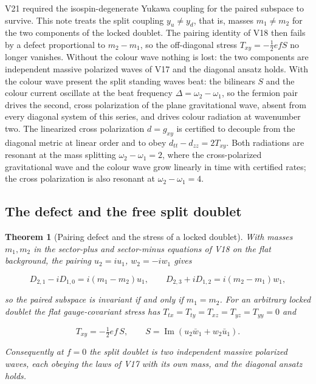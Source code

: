 \documentclass[11pt]{article}
\newtheorem{theorem}{Theorem}[section]
\theoremstyle{remark}
\begin{document}
V21 required the isospin-degenerate Yukawa coupling for the paired
subspace to survive.  This note treats the split coupling
\(y_u\neq y_d\), that is, masses \(m_1\neq m_2\) for the two
components of the locked doublet.  The pairing identity of V18 then
fails by a defect proportional to \(m_2-m_1\), so the off-diagonal
stress \(T_{xy}=-\tfrac12efS\) no longer vanishes.  Without the colour
wave nothing is lost: the two components are independent massive
polarized waves of V17 and the diagonal ansatz holds.  With the colour
wave present the split standing waves beat: the bilinears
\(S\) and the colour current oscillate at the beat frequency
\(\Delta=\omega_2-\omega_1\), so the fermion pair drives the second,
cross polarization of the plane gravitational wave, absent from every
diagonal system of this series, and drives colour radiation at
wavenumber two.  The linearized cross polarization \(d=g_{xy}\) is
certified to decouple from the diagonal metric at linear order and to
obey \(d_{tt}-d_{zz}=2T_{xy}\).  Both radiations are resonant at the
mass splitting \(\omega_2-\omega_1=2\), where the cross-polarized
gravitational wave and the colour wave grow linearly in time with
certified rates; the cross polarization is also resonant at
\(\omega_2-\omega_1=4\).

\subsection{The defect and the free split doublet}

\begin{theorem}[Pairing defect and the stress of a locked doublet]
\label{thm:v20v22-defect}
With masses \(m_1,m_2\) in the sector-plus and sector-minus equations
of V18 on the flat background, the pairing \(u_2=iu_1\), \(w_2=-iw_1\)
gives

\[
 D_{2,1}-iD_{1,0}=i(m_1-m_2)u_1,\qquad D_{2,3}+iD_{1,2}=i(m_2-m_1)w_1,
                                                                    \tag{25.1}
\]

so the paired subspace is invariant if and only if \(m_1=m_2\).  For an
arbitrary locked doublet the flat gauge-covariant stress has
\(T_{tx}=T_{ty}=T_{xz}=T_{yz}=T_{yy}=0\) and

\[
 T_{xy}=-\tfrac12ef\,S,\qquad S=\operatorname{Im}(u_2\bar w_1+w_2\bar u_1).
                                                                    \tag{25.2}
\]

Consequently at \(f=0\) the split doublet is two independent massive
polarized waves, each obeying the laws of V17 with its own mass, and
the diagonal ansatz holds.
\end{theorem}
\end{document}
